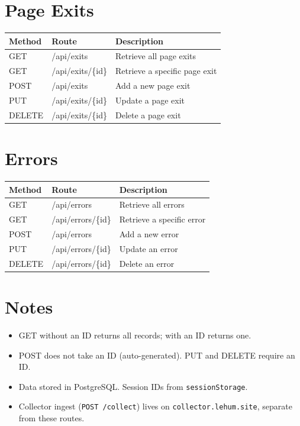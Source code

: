 \documentclass[11pt]{article}
\begin{document}
\section*{Page Exits}
\begin{tabular}{@{}llp{7.5cm}@{}}
\toprule
Method & Route & Description \\
\midrule
GET    & /api/exits       & Retrieve all page exits \\
GET    & /api/exits/\{id\}  & Retrieve a specific page exit \\
POST   & /api/exits       & Add a new page exit \\
PUT    & /api/exits/\{id\}  & Update a page exit \\
DELETE & /api/exits/\{id\}  & Delete a page exit \\
\bottomrule
\end{tabular}

\section*{Errors}
\begin{tabular}{@{}llp{7.5cm}@{}}
\toprule
Method & Route & Description \\
\midrule
GET    & /api/errors       & Retrieve all errors \\
GET    & /api/errors/\{id\}  & Retrieve a specific error \\
POST   & /api/errors       & Add a new error \\
PUT    & /api/errors/\{id\}  & Update an error \\
DELETE & /api/errors/\{id\}  & Delete an error \\
\bottomrule
\end{tabular}

\section*{Notes}
\begin{itemize}
  \item GET without an ID returns all records; with an ID returns one.
  \item POST does not take an ID (auto-generated). PUT and DELETE require an ID.
  \item Data stored in PostgreSQL. Session IDs from \texttt{sessionStorage}.
  \item Collector ingest (\texttt{POST /collect}) lives on \texttt{collector.lehum.site}, separate from these routes.
\end{itemize}
\end{document}
